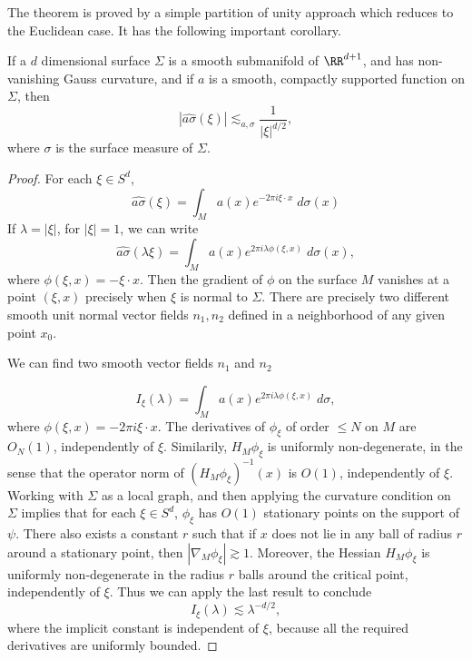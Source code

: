 The theorem is proved by a simple partition of unity approach which reduces to the Euclidean case. It has the following important corollary.

\begin{theorem}
  If a $d$ dimensional surface $\Sigma$ is a smooth submanifold of $\RR^{d+1}$, and has non-vanishing Gauss curvature, and if $a$ is a smooth, compactly supported function on $\Sigma$, then
    \[ |\widehat{a \sigma}(\xi)| \lesssim_{a,\sigma} \frac{1}{|\xi|^{d/2}}, \]
    where $\sigma$ is the surface measure of $\Sigma$.
\end{theorem}
\begin{proof}
  For each $\xi \in S^d$,
  \[ \widehat{a \sigma}(\xi) = \int_M a(x) e^{- 2 \pi i \xi \cdot x}\; d\sigma(x) \]
  If $\lambda = |\xi|$, for $|\xi| = 1$, we can write
  \[ \widehat{a \sigma}(\lambda \xi) = \int_M a(x) e^{2 \pi i \lambda \phi(\xi,x)}\; d\sigma(x), \]
  where $\phi(\xi,x) = - \xi \cdot x$. Then the gradient of $\phi$ on the
  surface $M$ vanishes at a point $(\xi,x)$ precisely when $\xi$ is normal to
  $\Sigma$. There are precisely two different smooth unit normal vector
  fields $n_1,n_2$ defined in a neighborhood of any given point $x_0$.


  We can find two smooth vector fields $n_1$ and $n_2$

  \[ I_\xi(\lambda) = \int_M a(x) e^{2 \pi i \lambda \phi(\xi,x)}\; d\sigma, \]
  where $\phi(\xi,x) = -2 \pi i \xi \cdot x$. The derivatives of $\phi_\xi$ of order $\leq N$ on $M$ are $O_N(1)$, independently of $\xi$. Similarily, $H_M \phi_\xi$ is uniformly non-degenerate, in the sense that the operator norm of $(H_M \phi_\xi)^{-1}(x)$ is $O(1)$, independently of $\xi$. Working with $\Sigma$ as a local graph, and then applying the curvature condition on $\Sigma$ implies that for each $\xi \in S^d$, $\phi_\xi$ has $O(1)$ stationary points on the support of $\psi$. There also exists a constant $r$ such that if $x$ does not lie in any ball of radius $r$ around a stationary point, then $|\nabla_M \phi_\xi| \gtrsim 1$. Moreover, the Hessian $H_M \phi_\xi$ is uniformly non-degenerate in the radius $r$ balls around the critical point, independently of $\xi$. Thus we can apply the last result to conclude
  \[ I_\xi(\lambda) \lesssim \lambda^{-d/2}, \]
  where the implicit constant is independent of $\xi$, because all the required derivatives are uniformly bounded.
\begin{comment}


\end{comment}
\end{proof}
